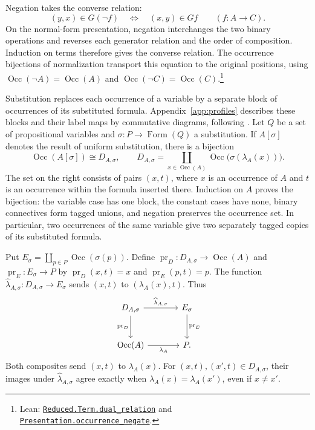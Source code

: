 \documentclass[11pt]{article}
\newcommand{\Occ}{\operatorname{Occ}}
\newcommand{\FormulaSet}{\operatorname{Form}}
\begin{document}
Negation takes the converse relation:
\[
 (y,x)\in G(\neg f)\quad\Longleftrightarrow\quad(x,y)\in Gf
 \qquad(f:A\to C).
\]
On the normal-form presentation, negation interchanges the two
binary operations and reverses each generator relation and the
order of composition. Induction on terms therefore gives the
converse relation. The occurrence bijections of normalization
transport this equation to the original positions, using
$\Occ(\neg A)=\Occ(A)$ and $\Occ(\neg C)=\Occ(C)$.\footnote{\raggedright Lean:
\href{https://github.com/flengyel/Dosen-Petric-Maximality/blob/5dbee39bea09539bd130f729e82636419f71f920/DosenPetric/ReducedDualRelations.lean\#L20}{\texttt{Reduced.Term.\allowbreak{}dual\_relation}} and
\href{https://github.com/flengyel/Dosen-Petric-Maximality/blob/5dbee39bea09539bd130f729e82636419f71f920/DosenPetric/PresentationNegationOccurrence.lean\#L25}{\texttt{Presentation.\allowbreak{}occurrence\_negate}}.}

Substitution replaces each occurrence of a variable by a separate
block of occurrences of its substituted formula.
Appendix~\ref{app:profiles} describes these blocks and their label maps
by commutative diagrams, following \cite[\S9]{Notation}.
Let $Q$ be a set of propositional variables and
$\sigma:P\to\FormulaSet(Q)$ a substitution. If $A[\sigma]$ denotes the
result of uniform substitution, there is a bijection
\begin{equation}
 \Occ(A[\sigma])\cong D_{A,\sigma},\qquad
 D_{A,\sigma}=\coprod_{x\in\Occ(A)}
                  \Occ\bigl(\sigma(\lambda_A(x))\bigr).
 \label{eq:occ-substitution}
\end{equation}
The set on the right consists of pairs $(x,t)$, where $x$ is an
occurrence of $A$ and $t$ is an occurrence within the formula inserted there.
Induction on $A$ proves the bijection: the variable case has one
block, the constant cases have none, binary connectives form tagged
unions, and negation preserves the occurrence set. In particular,
two occurrences of the same variable give two separately tagged
copies of its substituted formula.

Put $E_\sigma=\coprod_{p\in P}\Occ(\sigma(p))$.
Define $\operatorname{pr}_D:D_{A,\sigma}\to\Occ(A)$ and
$\operatorname{pr}_E:E_\sigma\to P$ by
$\operatorname{pr}_D(x,t)=x$ and $\operatorname{pr}_E(p,t)=p$.
The function
$\widehat\lambda_{A,\sigma}:D_{A,\sigma}\to E_\sigma$ sends
$(x,t)$ to $(\lambda_A(x),t)$. Thus
\begin{equation}
\begin{tikzcd}[column sep=large,row sep=large]
 D_{A,\sigma}\arrow[r,"\widehat\lambda_{A,\sigma}"]
   \arrow[d,"\operatorname{pr}_D"']
   &E_\sigma\arrow[d,"\operatorname{pr}_E"]\\
 \Occ(A)\arrow[r,"\lambda_A"']&P.
\end{tikzcd}
\label{eq:block-square}
\end{equation}
Both composites send $(x,t)$ to $\lambda_A(x)$.
For $(x,t),(x',t)\in D_{A,\sigma}$, their images under
$\widehat\lambda_{A,\sigma}$ agree exactly when
$\lambda_A(x)=\lambda_A(x')$, even if $x\ne x'$.
\end{document}

